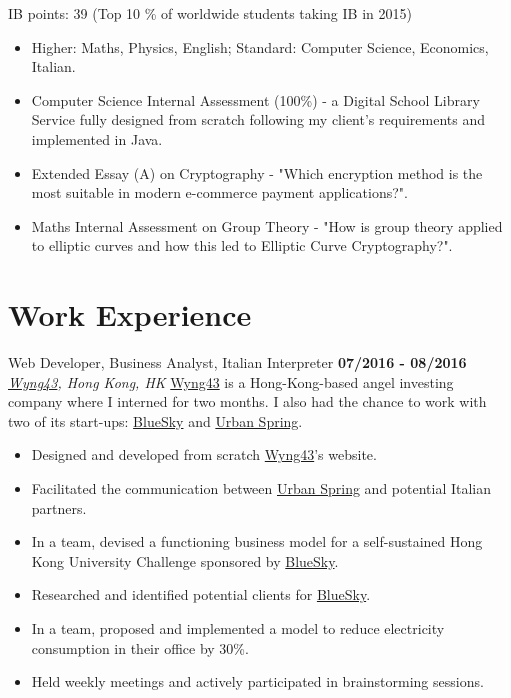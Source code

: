 \documentclass[]{friggeri-cv}
\begin{document}
\begin{entrylist}
    {IB points: 39  (Top 10 \% of worldwide students taking IB in 2015)}
    \begin{itemize}
        \item Higher: Maths, Physics, English; Standard: Computer Science, Economics, Italian.
        \item Computer Science Internal Assessment (100\%) - a Digital School Library Service fully designed from scratch following my client's requirements and implemented in Java.
        \item Extended Essay (A) on Cryptography - "Which encryption method is the most suitable in modern e-commerce payment applications?".
        \item Maths Internal Assessment on Group Theory - "How is group theory applied to elliptic curves and how this led to Elliptic Curve Cryptography?". \\
    \end{itemize}
\end{entrylist}

\section{\color{red}Work \color{gray} Experience}
\begin{entrylist}
  \entry
    {}
    {Web Developer, Business Analyst, Italian Interpreter}
    {\textbf{07/2016 - 08/2016}}
    {\emph{\href{http://www.wyng43.com/}{Wyng43}, Hong Kong, HK}}
    {\href{http://www.wyng43.com/}{Wyng43} is a Hong-Kong-based angel investing company where I interned for two months. I also had the chance to work with two of its start-ups: \href{http://www.hibluesky.co/}{BlueSky} and \href{http://www.urbanspring.hk/}{Urban Spring}.}
    \begin{itemize}
        \item Designed and developed from scratch \href{http://www.wyng43.com/}{Wyng43}'s website.
        \item Facilitated the communication between \href{http://www.urbanspring.hk/}{Urban Spring} and potential Italian partners.
        \item In a team, devised a functioning business model for a self-sustained Hong Kong University Challenge sponsored by \href{http://www.hibluesky.co/}{BlueSky}.
        \item Researched and identified potential clients for \href{http://www.hibluesky.co/}{BlueSky}.
        \item In a team, proposed and implemented a model to reduce electricity consumption in their office by 30\%.
        \item Held weekly meetings and actively participated in brainstorming sessions.
    \end{itemize}
\end{entrylist}
\end{document}
